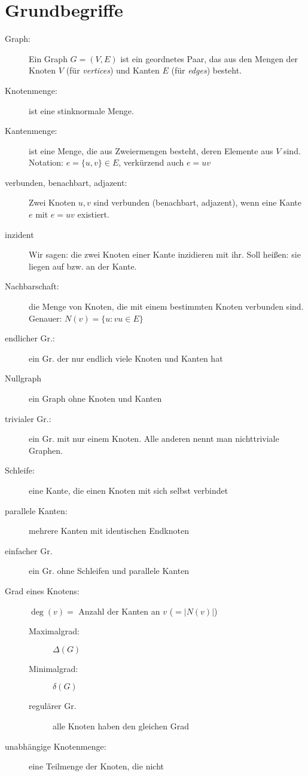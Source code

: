 \documentclass[%
a4paper, %
9pt,              %
leqno,            %
fleqn,            %
]
{scrartcl}
\begin{document}
\section*{Grundbegriffe} %
\label{sec:Grundbegriffe}

\begin{description}
  \item[Graph:] Ein Graph $G = (V,E)$ ist ein geordnetes Paar, das aus den
    Mengen der Knoten $V$ (für \textit{vertices}) und Kanten $E$ (für
    \textit{edges}) besteht.
  \item[Knotenmenge:] ist eine stinknormale Menge.
  \item[Kantenmenge:] ist eine Menge, die aus Zweiermengen besteht, deren
    Elemente aus $V$ sind. Notation: $e = \{u,v\} \in E$, verkürzend auch $e =
    uv$
  \item[verbunden, benachbart, adjazent:] Zwei Knoten $u,v$ sind verbunden
    (benachbart, adjazent), wenn eine Kante $e$ mit $e = uv$ existiert.
  \item[inzident] Wir sagen: die zwei Knoten einer Kante inzidieren mit ihr.
    Soll heißen: sie liegen auf bzw. an der Kante.
  \item[Nachbarschaft:] die Menge von Knoten, die mit einem bestimmten Knoten
    verbunden sind. Genauer: $N(v) = \{ u : vu \in E \}$
  \item[endlicher Gr.:] ein Gr. der nur endlich viele Knoten und Kanten hat
  \item[Nullgraph] ein Graph ohne Knoten und Kanten
  \item[trivialer Gr.:] ein Gr. mit nur einem Knoten. Alle anderen nennt man
    nichttriviale Graphen.
  \item[Schleife:] eine Kante, die einen Knoten mit sich selbst verbindet
  \item[parallele Kanten:] mehrere Kanten mit identischen Endknoten
  \item[einfacher Gr.] ein Gr. ohne Schleifen und parallele Kanten
  \item[Grad eines Knotens:] $\deg(v)=$ Anzahl der Kanten an $v$ ($=|N(v)|$)
  \begin{description}
    \item[Maximalgrad:] $\Delta(G)$
    \item[Minimalgrad:] $\delta(G)$
    \item[regulärer Gr.] alle Knoten haben den gleichen Grad
  \end{description}
  \item[unabhängige Knotenmenge:] eine Teilmenge der Knoten, die nicht

\end{description}
\end{document}
